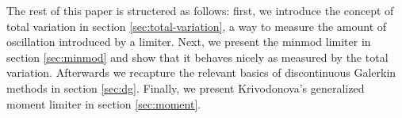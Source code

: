 The rest of this paper is structered as follows: first, we introduce the concept of total variation in section \ref{sec:total-variation}, a way to measure the amount of oscillation introduced by a limiter.
Next, we present the minmod limiter in section \ref{sec:minmod} and show that it behaves nicely as measured by the total variation.
Afterwards we recapture the relevant basics of discontinuous Galerkin methods in section \ref{sec:dg}.
Finally, we present Krivodonova's generalized moment limiter in section \ref{sec:moment}.

